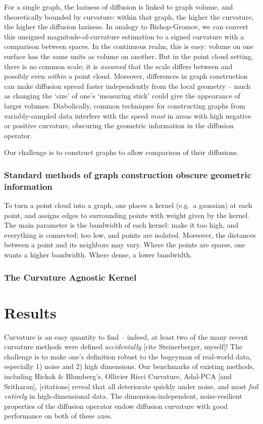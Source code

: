 \documentclass[
  letterpaper,
  DIV=11,
  numbers=noendperiod]{scrartcl}
\theoremstyle{plain}
\theoremstyle{plain}
\theoremstyle{definition}
\theoremstyle{definition}
\theoremstyle{remark}
\begin{document}
For a single graph, the laziness of diffusion is linked to graph volume,
and theoretically bounded by curvature: within that graph, the higher
the curvature, the higher the diffusion laziness. In analogy to
Bishop-Gromov, we can convert this unsigned magnitude-of-curvature
estimation to a signed curvature with a comparison between spaces. In
the continuous realm, this is easy: volume on one surface has the same
units as volume on another. But in the point cloud setting, there is no
common scale; it is \emph{assumed} that the scale differs between and
possibly even \emph{within} a point cloud. Moreover, differences in
graph construction can make diffusion spread faster independently from
the local geometry -- much as changing the `size' of one's `measuring
stick' could give the appearance of larger volumes. Diabolically, common
techniques for constructing graphs from variably-sampled data interfere
with the speed \emph{most} in areas with high negative or positive
curvature, obscuring the geometric information in the diffusion
operator.

Our challenge is to construct graphs to allow comparison of their
diffusions.

\subsubsection{Standard methods of graph construction obscure geometric
information}\label{standard-methods-of-graph-construction-obscure-geometric-information}

To turn a point cloud into a graph, one places a kernel (e.g.~a
gaussian) at each point, and assigns edges to surrounding points with
weight given by the kernel. The main parameter is the bandwidth of each
kernel: make it too high, and everything is connected; too low, and
points are isolated. Moreover, the distances between a point and its
neighbors may vary. Where the points are sparse, one wants a higher
bandwidth. Where dense, a lower bandwidth.

\subsubsection{The Curvature Agnostic
Kernel}\label{the-curvature-agnostic-kernel}

\section{Results}\label{results}

Curvature is an easy quantity to find -- indeed, at least two of the
many recent curvature methods were defined \emph{accidentally} {[}cite
Steinerberger, myself{]}! The challenge is to make one's definition
robust to the bogeyman of real-world data, especially 1) noise and 2)
high dimensions. Our benchmarks of existing methods, including Hickok \&
Blumberg's, Ollivier Ricci Curvature, Adal-PCA {[}and Sritharan{]},
{[}citations{]} reveal that all deteriorate quickly under noise, and
most \emph{fail entirely} in high-dimensional data. The
dimension-independent, noise-resilient properties of the diffusion
operator endow diffusion curvature with good performance on both of
these axes.
\end{document}
